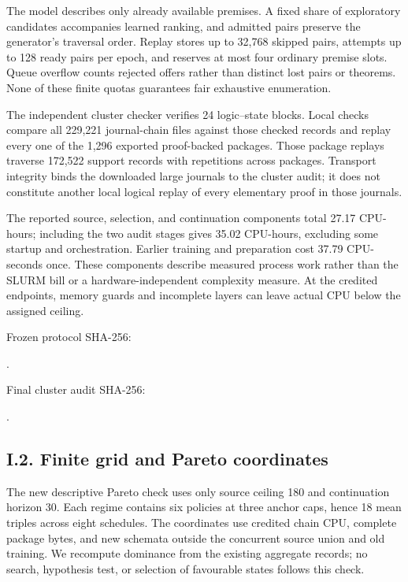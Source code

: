\documentclass[pdflatex,sn-basic,Numbered]{sn-jnl}
\begin{document}
The model describes only already available premises. A fixed share of exploratory candidates accompanies learned ranking, and admitted pairs preserve the generator's traversal order. Replay stores up to 32,768 skipped pairs, attempts up to 128 ready pairs per epoch, and reserves at most four ordinary premise slots. Queue overflow counts rejected offers rather than distinct lost pairs or theorems. None of these finite quotas guarantees fair exhaustive enumeration.

The independent cluster checker verifies 24 logic--state blocks. Local checks compare all 229,221 journal-chain files against those checked records and replay every one of the 1,296 exported proof-backed packages. Those package replays traverse 172,522 support records with repetitions across packages. Transport integrity binds the downloaded large journals to the cluster audit; it does not constitute another local logical replay of every elementary proof in those journals.

The reported source, selection, and continuation components total 27.17 CPU-hours; including the two audit stages gives 35.02 CPU-hours, excluding some startup and orchestration. Earlier training and preparation cost 37.79 CPU-seconds once. These components describe measured process work rather than the SLURM bill or a hardware-independent complexity measure. At the credited endpoints, memory guards and incomplete layers can leave actual CPU below the assigned ceiling.

Frozen protocol SHA-256:

.

Final cluster audit SHA-256:

.

\subsection*{I.2. Finite grid and Pareto coordinates}\label{i.2.-finite-grid-and-pareto-coordinates}

The new descriptive Pareto check uses only source ceiling 180 and continuation horizon 30. Each regime contains six policies at three anchor caps, hence 18 mean triples across eight schedules. The coordinates use credited chain CPU, complete package bytes, and new schemata outside the concurrent source union and old training. We recompute dominance from the existing aggregate records; no search, hypothesis test, or selection of favourable states follows this check.
\end{document}
